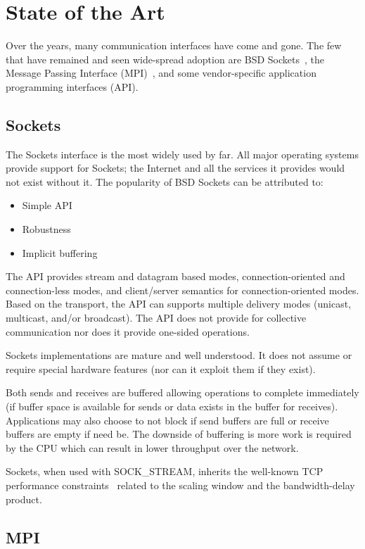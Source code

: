 \section{State of the Art}
\label{sec:state}
Over the years, many communication interfaces have come and gone. The few that have
remained and seen wide-spread adoption are BSD Sockets~\cite{Sechrest:CSD-84-191}, the Message Passing
Interface (MPI)~\cite{mpi_forum93:_mpi}, and some vendor-specific application programming interfaces
(API).

\subsection{Sockets} The Sockets interface is the most widely used by far. All major
operating systems provide support for Sockets; the Internet and all the services it
provides would not exist without it. The popularity of BSD Sockets can be attributed to:

\begin{itemize}
\item Simple API
\item Robustness
\item Implicit buffering
\end{itemize}

The API provides stream and datagram based modes, connection-oriented and connection-less
modes, and client/server semantics for connection-oriented modes. Based on the transport,
the API can supports multiple delivery modes (unicast, multicast, and/or broadcast). The
API does not provide for collective communication nor does it provide one-sided
operations.

Sockets implementations are mature and well understood. It does not assume or require
special hardware features (nor can it exploit them if they exist).

Both sends and receives are buffered allowing operations to complete immediately (if buffer
space is available for sends or data exists in the buffer for receives). Applications may
also choose to not block if send buffers are full or receive buffers are empty if need be.
The downside of buffering is more work is required by the CPU which can result in lower
throughput over the network.

Sockets, when used with SOCK\_STREAM, inherits the well-known TCP
performance constraints~\cite{Foong03tcpperformance} related to the
scaling window and the bandwidth-delay product. 

\subsection{MPI}
\label{sec:mpi} 


